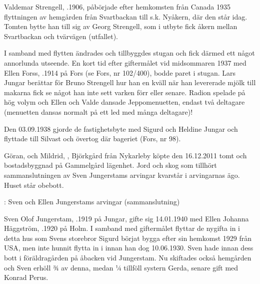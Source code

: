 
%
Valdemar Strengell, .1906, påbörjade efter hemkomsten från Canada 1935 flyttningen av hemgården från Svartbackan till s.k. Nyåkern, där den står idag. Tomten bytte han till sig av Georg Strengell, som i utbyte fick åkern mellan Svartbackan och tvärvägen (utfallet).

I samband med flytten ändrades och tillbyggdes stugan och fick därmed ett något annorlunda utseende. En kort tid efter giftermålet vid midsommaren 1937 med Ellen Forss, .1914 på Fors (se Fors, nr 102/400), bodde paret i stugan. Lars Jungar berättar för Bruno Strengell hur han en kväll när han levererade mjölk till makarna fick se något han inte sett varken förr eller senare. Radion spelade på hög volym och Ellen och Valde dansade Jeppomenuetten, endast två deltagare (menuetten dansas normalt på ett led med många deltagare)!

Den 03.09.1938 gjorde de fastighetsbyte med Sigurd och Heldine Jungar och flyttade till Silvast och övertog där bageriet (Fors, nr 98).



%



%
Göran,  och Mildrid, , Björkgård från Nykarleby köpte den 16.12.2011 tomt och bostadsbyggnad på Gammelgård lägenhet. Jord och skog som tillhört sammanslutningen av Sven Jungerstams arvingar kvarstår i arvingarnas ägo. Huset står obebott.


: Sven och Ellen Jungerstams arvingar (sammanslutning)



%
Sven Olof Jungerstam, .1919 på Jungar, gifte sig 14.01.1940 med Ellen Johanna Häggström, .1920 på Holm. I samband med giftermålet flyttar de nygifta in i detta hus som Svens storebror Sigurd börjat bygga efter sin hemkomst 1929 från USA, men inte hunnit flytta in i innan han dog 10.06.1930. Sven hade innan dess bott i föräldragården på åbacken vid Jungerstam. Nu skiftades också hemgården och Sven erhöll ¾ av denna, medan ¼ tillföll systern Gerda, senare gift med Konrad Perus.

